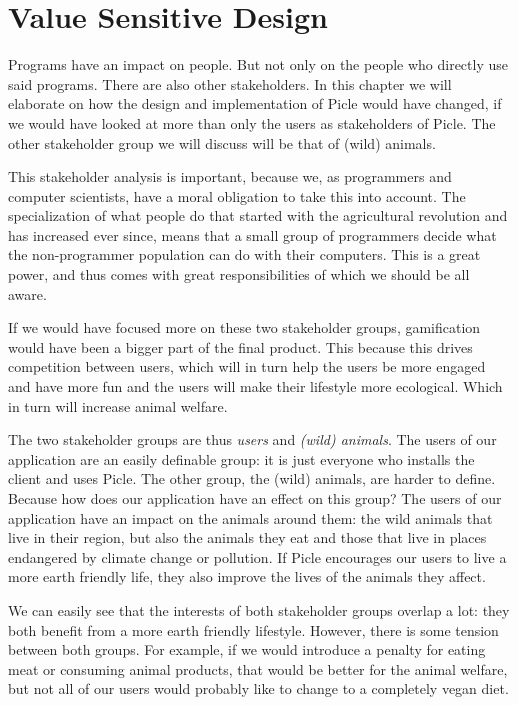 \chapter{Value Sensitive Design}\label{ch:ethics}
Programs have an impact on people. But not only on the people who directly use said programs.
There are also other stakeholders. In this chapter we will elaborate on how the design
and implementation of Picle would have changed, if we would have looked at more than only
the users as stakeholders of Picle. The other stakeholder group we will discuss will be
that of (wild) animals.

This stakeholder analysis is important, because we, as programmers and computer scientists,
have a moral obligation to take this into account. The specialization of what people do
that started with the agricultural revolution and has increased ever since, means that
a small group of programmers decide what the non-programmer population can do with their
computers. This is a great power, and thus comes with great responsibilities of which
we should be all aware.

If we would have focused more on these two stakeholder groups, gamification would have
been a bigger part of the final product. This because this drives competition between
users, which will in turn help the users be more engaged and have more fun and the
users will make their lifestyle more ecological. Which in turn will increase animal
welfare.

The two stakeholder groups are thus \emph{users} and \emph{(wild) animals}. The users of
our application are an easily definable group: it is just everyone who installs the client
and uses Picle. The other group, the (wild) animals, are harder to define. Because how
does our application have an effect on this group? The users of our application have an
impact on the animals around them: the wild animals that live in their region, but also
the animals they eat and those that live in places endangered by climate change or
pollution. If Picle encourages our users to live a more earth friendly life, they also
improve the lives of the animals they affect.

We can easily see that the interests of both stakeholder groups overlap a lot: they both
benefit from a more earth friendly lifestyle. However, there is some tension between
both groups. For example, if we would introduce a penalty for eating meat or consuming
animal products, that would be better for the animal welfare, but not all of our users
would probably like to change to a completely vegan diet.

